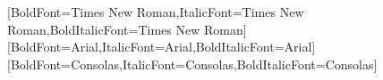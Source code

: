 \usepackage{fontspec}
\setmainfont{Times New Roman}[BoldFont={Times New Roman},ItalicFont={Times New Roman},BoldItalicFont={Times New Roman}]
\setsansfont{Arial}[BoldFont={Arial},ItalicFont={Arial},BoldItalicFont={Arial}]
\setmonofont{Consolas}[BoldFont={Consolas},ItalicFont={Consolas},BoldItalicFont={Consolas}]
\usepackage[math-style=upright]{unicode-math}
\renewcommand{\boldsymbol}[1]{\symup{#1}}
\renewcommand{\mathbf}[1]{\symup{#1}}
\renewcommand{\mathcal}[1]{\symsfup{#1}}
\renewcommand{\em}{\upshape\mdseries}
\renewcommand{\bfseries}{\mdseries}
\renewcommand{\itshape}{\upshape}
